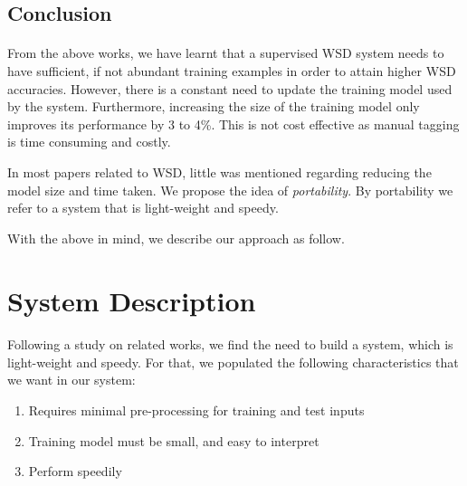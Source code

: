 \documentclass[a4paper,12pt]{nurop}
\begin{document}


\subsection{Conclusion}
\paragraph{}
From the above works, we have learnt that a supervised WSD system needs to have sufficient, if not abundant training examples in order to attain higher WSD accuracies. However, there is a constant need to update the training model used by the system. Furthermore, increasing the size of the training model only improves its performance by 3 to 4\%\cite{noisychannel}. This is not cost effective as manual tagging is time consuming and costly.

In most papers related to WSD, little was mentioned regarding reducing the model size and time taken. We propose the idea of \textit{portability}. By portability we refer to a system that is light-weight and speedy.

With the above in mind, we describe our approach as follow.

\section{System Description}
\paragraph{}
Following a study on related works, we find the need to build a system, which is light-weight and speedy. For that, we populated the following characteristics that we want in our system:
\begin{enumerate}
\footnotesize
\item Requires minimal pre-processing for training and test inputs
\item Training model must be small, and easy to interpret
\item Perform speedily
\end{enumerate}
\end{document}
